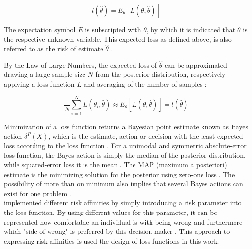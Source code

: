         \begin{equation}\label{eq:ExpectedLoss}
        l(\hat{\theta}) = E_{\theta}[L(\theta,\hat{\theta})]
        \end{equation}  
        
        The expectation symbol $E$ is subscripted with $\theta$, by which it is indicated that $\theta$ is the respective unknown variable. This expected loss as defined above, is also referred to as the risk of estimate $\hat{\theta}$ \citep{davidson2015}.
        
        By the Law of Large Numbers, the expected loss of $\hat{\theta}$ can be approximated drawing a large sample size $N$ from the posterior distribution, respectively applying a loss function $L$ and averaging of the number of samples \citep{davidson2015}:
        
        \begin{equation}\label{eq:ExpectedLoss2}
        \frac{1}{N}\sum_{i=1}^{N} L(\theta_i,\hat{\theta}) \approx E_{\theta}[L(\theta,\hat{\theta})] = l(\hat{\theta})
        \end{equation}
        
        Minimization of a loss function returns a Bayesian point estimate known as Bayes action $\delta^P(X)$, which is the estimate, action or decision with the least expected loss according to the loss function \citep{berger2013stat}. For a unimodal and symmetric absolute-error loss function, the Bayes action is simply the median of the posterior distribution, while squared-error loss it is the mean \citep{davidson2015, berger2013stat}. The MAP (maximum a posteriori) estimate is the minimizing solution for the posterior using zero-one loss \citep{davidson2015}. The possibility of more than on minimum also implies that several Bayes actions can exist for one problem \citep{berger2013stat}.\\
        \citet{davidson2015} implemented different risk affinities by simply  introducing a risk parameter into the loss function. By using different values for this parameter, it can be represented how comfortable an individual is with being wrong and furthermore which "side of wrong" is preferred by this decision maker \citep{davidson2015}. This approach to expressing risk-affinities is used the design of loss functions in this work.
        
        
